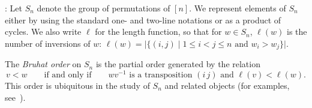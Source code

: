 \documentclass[submission]{FPSAC2024}
\newtheorem{prop}[equation]{Proposition}
\theoremstyle{definition}
\theoremstyle{remark}
\numberwithin{equation}{section}
\begin{document}
\medskip {}:
Let $S_n$ denote the group of permutations of $[n]$.  We represent elements of $S_{n}$ either by using the standard one- and two-line notations or as a product of cycles.  We also write $\ell$ for the length function, so that for $w \in S_{n}$, $\ell(w)$ is the number of inversions of $w$:
$
\ell(w) = |\{(i, j) \;|\; \text{$1 \le i < j \le n$ and $w_{i} > w_{j}$}\}|.
$

The \emph{Bruhat order} on $S_{n}$ is the partial order generated by the relation
\[
v < w \qquad\text{if and only if} \qquad \text{$wv^{-1}$ is a transposition $(i\,j)$ and $\ell(v) < \ell(w)$}.
\]
This order is ubiquitous in the study of $S_{n}$ and related objects (for examples, see~\cite{BjornerBrenti}).

%
%

\end{document}
